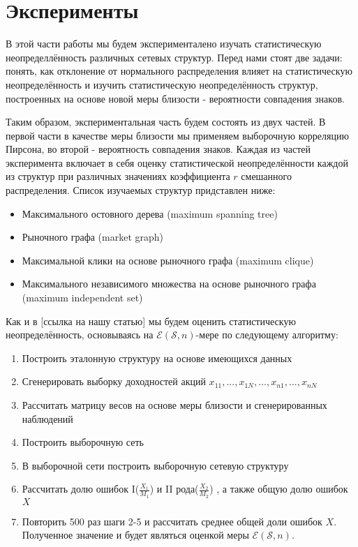 \section{Эксперименты}

В этой части работы мы будем эксперименталено изучать статистическую неопределлённость различных сетевых структур. Перед нами стоят две задачи: понять, как отклонение от нормального распределения влияет на статистическую неопределённость и изучить статистическую неопределённость структур, построенных на основе новой меры близости - вероятности совпадения знаков.

Таким образом, экспериментальная часть будем состоять из двух частей. В первой части в качестве меры близости мы применяем выборочную корреляцию Пирсона, во второй - вероятность совпадения знаков. Каждая из частей эксперимента включает в себя оценку статистической неопределённости каждой из структур  при различных значениях коэффициента $r$ смешанного распределения. 
Список изучаемых структур придставлен ниже:
\begin{itemize}
	\item Максимального остовного дерева (maximum spanning tree)
	\item Рыночного графа (market graph)
	\item Максимальной клики на основе рыночного графа (maximum clique)
	\item Максимального независимого множества на основе рыночного графа (maximum independent set)
\end{itemize}


Как и в [ссылка на нашу статью] мы будем оценить статистическую неопределённость, основываясь на $\mathcal{E}(\mathcal{S},n)$-мере по следующему алгоритму: 
\begin{enumerate}
	\item Построить эталонную структуру на основе имеющихся данных
	\item Сгенерировать выборку доходностей акций $x_{1 1}, ..., x_{1 N}, ..., x_{n 1}, ..., x_{n N}$
	\item Рассчитать матрицу весов на основе меры близости и сгенерированных наблюдений
	\item Построить выборочную сеть
	\item В выборочной сети построить выборочную сетевую структуру
	\item Рассчитать долю ошибок I($\frac{X_1}{M_1}$) и II рода($\frac{X_2}{M_2}$) , а также общую долю ошибок $X$
	\item Повторить 500 раз шаги 2-5 и рассчитать среднее общей доли ошибок $X$. Полученное значение и будет являться оценкой меры $\mathcal{E}(\mathcal{S},n)$.
\end{enumerate}

